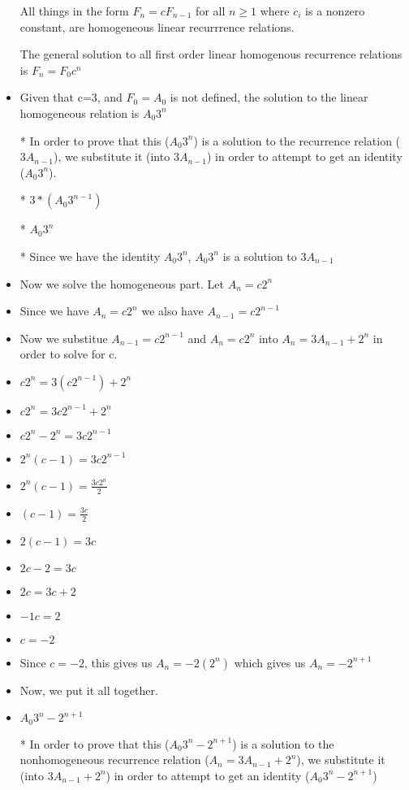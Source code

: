 \documentclass{article}
\begin{document}
\begin{enumerate}
\begin{enumerate}
\begin{itemize}
\begin{itemize}
      \item [] All things in the form $F_{n}=cF_{n-1}$ for all $n\geq1$ where $c_{i}$ is a nonzero constant, are homogeneous linear recurrrence relations.
      \item [] The general solution to all first order linear homogenous recurrence relations is $F_{n}=F_{0}c^{n}$
      \item Given that c=3, and $F_{0}=A_{0}$ is not defined, the solution to the linear homogeneous relation is $A_{0}3^{n}$
      \item [*] In order to prove that this ($A_{0}3^{n}$) is a solution to the recurrence relation ($3A_{n-1}$), we substitute it (into $3A_{n-1}$) in order to attempt to get an identity ($A_{0}3^{n}$).
      \item [*] $3*(A_{0}3^{n-1})$
      \item [*] $A_{0}3^{n}$
      \item [*] Since we have the identity $A_{0}3^{n}$, $A_{0}3^{n}$ is a solution to $3A_{n-1}$
      \item Now we solve the homogeneous part. Let $A_{n}=c2^{n}$ 
      \item Since we have $A_{n}=c2^{n}$ we also have $A_{n-1}=c2^{n-1}$
      \item Now we substitue $A_{n-1}=c2^{n-1}$ and $A_{n}=c2^{n}$ into $A_{n}=3A_{n-1}+2^{n}$ in order to solve for c.
      \item $c2^{n}=3(c2^{n-1})+2^{n}$
      \item $c2^{n}=3c2^{n-1}+2^{n}$
      \item $c2^{n}-2^{n}=3c2^{n-1}$
      \item $2^{n}(c-1)=3c2^{n-1}$
      \item $2^{n}(c-1)=\frac{3c2^{n}}{2}$
      \item $(c-1)=\frac{3c}{2}$
      \item $2(c-1)=3c$
      \item $2c-2=3c$
      \item $2c=3c+2$
      \item $-1c=2$
      \item $c=-2$
      \item Since $c=-2$, this gives us $A_{n}=-2(2^{n})$ which gives us $A_{n}=-2^{n+1}$
      \item Now, we put it all together.
      \item $A_{0}3^{n}-2^{n+1}$
      \item [*] In order to prove that this ($A_{0}3^{n}-2^{n+1}$) is a solution to the nonhomogeneous recurrence relation ($A_{n}=3A_{n-1}+2^{n}$), we substitute it (into $3A_{n-1}+2^{n}$) in order to attempt to get an identity ($A_{0}3^{n}-2^{n+1}$)

\end{itemize}
\end{itemize}
\end{enumerate}
\end{enumerate}
\end{document}
